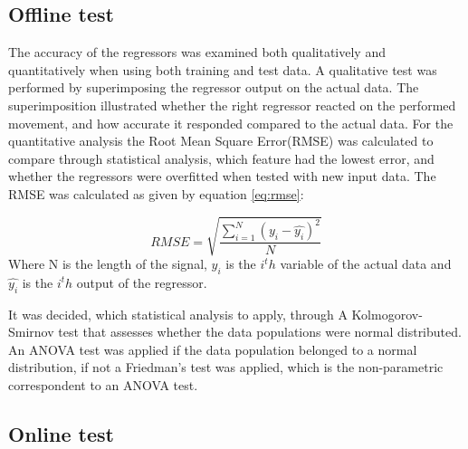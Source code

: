 \subsection{Offline test}
The accuracy of the regressors was examined both qualitatively and quantitatively when using both training and test data. A qualitative test was performed by superimposing the regressor output on the actual data. The superimposition illustrated whether the right regressor reacted on the performed movement, and how accurate it responded compared to the actual data. For the quantitative analysis the Root Mean Square Error(RMSE) was calculated to compare through statistical analysis, which feature had the lowest error, and whether the regressors were overfitted when tested with new input data. The RMSE was calculated as given by equation \ref{eq:rmse}:

\begin{equation}\label{eq:rmse}
RMSE = \sqrt{\frac{\sum\limits_{i=1}^N(y_i - \hat{y_i})^2}{N}}
\end{equation}
Where N is the length of the signal, $y_i$ is the $i^th$ variable of the actual data and $\hat{y_i}$ is the $i^th$ output of the regressor.

It was decided, which statistical analysis to apply, through A Kolmogorov-Smirnov test that assesses whether the data populations were normal distributed. An ANOVA test was applied if the data population belonged to a normal distribution, if not a Friedman's test was applied, which is the non-parametric correspondent to an ANOVA test.

\subsection{Online test}


